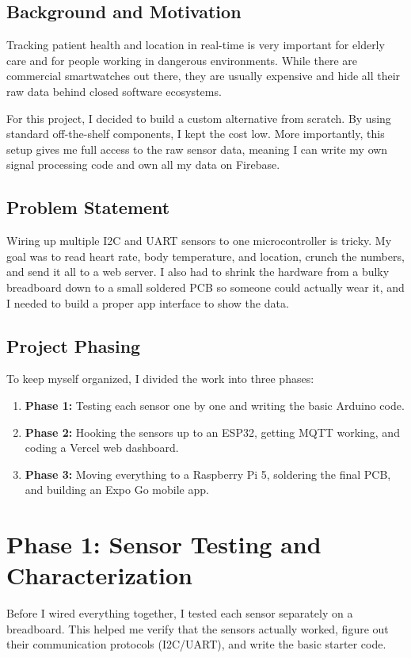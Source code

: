 \documentclass[12pt,a4paper,oneside]{report}
\begin{document}
\section{Background and Motivation}
Tracking patient health and location in real-time is very important for elderly care and for people working in dangerous environments. While there are commercial smartwatches out there, they are usually expensive and hide all their raw data behind closed software ecosystems. 

For this project, I decided to build a custom alternative from scratch. By using standard off-the-shelf components, I kept the cost low. More importantly, this setup gives me full access to the raw sensor data, meaning I can write my own signal processing code and own all my data on Firebase.

\section{Problem Statement}
Wiring up multiple I2C and UART sensors to one microcontroller is tricky. My goal was to read heart rate, body temperature, and location, crunch the numbers, and send it all to a web server. I also had to shrink the hardware from a bulky breadboard down to a small soldered PCB so someone could actually wear it, and I needed to build a proper app interface to show the data.

\section{Project Phasing}
To keep myself organized, I divided the work into three phases:
\begin{enumerate}
    \item \textbf{Phase 1:} Testing each sensor one by one and writing the basic Arduino code.
    \item \textbf{Phase 2:} Hooking the sensors up to an ESP32, getting MQTT working, and coding a Vercel web dashboard.
    \item \textbf{Phase 3:} Moving everything to a Raspberry Pi 5, soldering the final PCB, and building an Expo Go mobile app.
\end{enumerate}


\chapter{Phase 1: Sensor Testing and Characterization}
Before I wired everything together, I tested each sensor separately on a breadboard. This helped me verify that the sensors actually worked, figure out their communication protocols (I2C/UART), and write the basic starter code.
\end{document}
